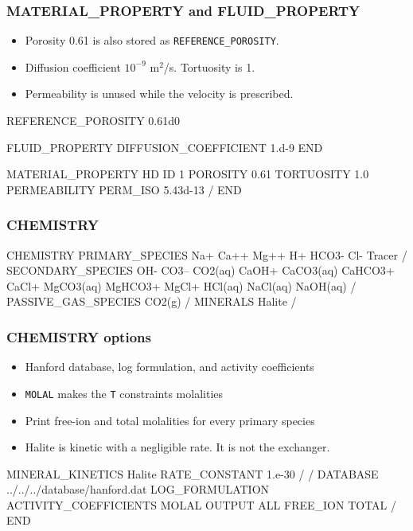 \documentclass{beamer}
\begin{document}
\begin{frame}[fragile]\frametitle{MATERIAL\_PROPERTY and FLUID\_PROPERTY}

\begin{itemize}
  \item Porosity 0.61 is also stored as \texttt{REFERENCE\_POROSITY}.
  \item Diffusion coefficient $10^{-9}$ m$^2$/s. Tortuosity is 1.
  \item Permeability is unused while the velocity is prescribed.
\end{itemize}

\begin{semiverbatim}
REFERENCE_POROSITY 0.61d0

FLUID_PROPERTY
  DIFFUSION_COEFFICIENT 1.d-9
END

MATERIAL_PROPERTY HD
  ID 1
  POROSITY 0.61
  TORTUOSITY 1.0
  PERMEABILITY
    PERM_ISO 5.43d-13
  /
END
\end{semiverbatim}

\end{frame}

\begin{frame}[fragile]\frametitle{CHEMISTRY}

\tiny
\begin{semiverbatim}
CHEMISTRY
  PRIMARY_SPECIES
    Na+
    Ca++
    Mg++
    H+
    HCO3-
    Cl-
    Tracer
  /
  SECONDARY_SPECIES
    OH-
    CO3--
    CO2(aq)
    CaOH+
    CaCO3(aq)
    CaHCO3+
    CaCl+
    MgCO3(aq)
    MgHCO3+
    MgCl+
    HCl(aq)
    NaCl(aq)
    NaOH(aq)
  /
  PASSIVE_GAS_SPECIES
    CO2(g)
  /
  MINERALS
    Halite
  /
\end{semiverbatim}

\end{frame}

\begin{frame}[fragile]\frametitle{CHEMISTRY options}

\begin{itemize}
  \item Hanford database, log formulation, and activity coefficients
  \item \texttt{MOLAL} makes the \texttt{T} constraints molalities
  \item Print free-ion and total molalities for every primary species
  \item Halite is kinetic with a negligible rate. It is not the exchanger.
\end{itemize}

\scriptsize
\begin{semiverbatim}
  MINERAL_KINETICS
    Halite
      RATE_CONSTANT 1.e-30
    /
  /
  DATABASE ../../../database/hanford.dat
  LOG_FORMULATION
  ACTIVITY_COEFFICIENTS
  MOLAL
  OUTPUT
    ALL
    FREE_ION
    TOTAL
  /
END
\end{semiverbatim}

\end{frame}
\end{document}
